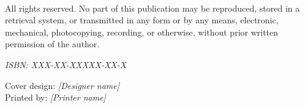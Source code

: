 \documentclass[../main.tex]{subfiles}
\begin{document}
\thispagestyle{empty}

\vspace*{\fill}

\begin{center}
\textcopyright\ \mydate\ \myauthor

\vspace{1cm}

All rights reserved. No part of this publication may be reproduced, stored in a retrieval system, or transmitted in any form or by any means, electronic, mechanical, photocopying, recording, or otherwise, without prior written permission of the author.

\vspace{2cm}

\textit{ISBN: XXX-XX-XXXXX-XX-X}

\vspace{0.5cm}

Cover design: \textit{[Designer name]}\\
Printed by: \textit{[Printer name]}

\end{center}

\vspace*{\fill}
\end{document}
